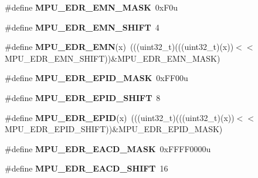 \begin{DoxyCompactItemize}
\item 
\#define {\bfseries M\+P\+U\+\_\+\+E\+D\+R\+\_\+\+E\+M\+N\+\_\+\+M\+A\+SK}~0x\+F0u\hypertarget{group__MPU__Register__Masks_ga57901086814557690f671d195d886423}{}\label{group__MPU__Register__Masks_ga57901086814557690f671d195d886423}

\item 
\#define {\bfseries M\+P\+U\+\_\+\+E\+D\+R\+\_\+\+E\+M\+N\+\_\+\+S\+H\+I\+FT}~4\hypertarget{group__MPU__Register__Masks_gad27c9ef1ae37201a6c16976311c5e1b3}{}\label{group__MPU__Register__Masks_gad27c9ef1ae37201a6c16976311c5e1b3}

\item 
\#define {\bfseries M\+P\+U\+\_\+\+E\+D\+R\+\_\+\+E\+MN}(x)~(((uint32\+\_\+t)(((uint32\+\_\+t)(x))$<$$<$M\+P\+U\+\_\+\+E\+D\+R\+\_\+\+E\+M\+N\+\_\+\+S\+H\+I\+FT))\&M\+P\+U\+\_\+\+E\+D\+R\+\_\+\+E\+M\+N\+\_\+\+M\+A\+SK)\hypertarget{group__MPU__Register__Masks_ga4d47da64a0139aeb64144967f3b60cfe}{}\label{group__MPU__Register__Masks_ga4d47da64a0139aeb64144967f3b60cfe}

\item 
\#define {\bfseries M\+P\+U\+\_\+\+E\+D\+R\+\_\+\+E\+P\+I\+D\+\_\+\+M\+A\+SK}~0x\+F\+F00u\hypertarget{group__MPU__Register__Masks_ga37328927ec3b6c036e4091cba2631af7}{}\label{group__MPU__Register__Masks_ga37328927ec3b6c036e4091cba2631af7}

\item 
\#define {\bfseries M\+P\+U\+\_\+\+E\+D\+R\+\_\+\+E\+P\+I\+D\+\_\+\+S\+H\+I\+FT}~8\hypertarget{group__MPU__Register__Masks_ga0cc03b3e200e7c9c27b3731305e7a007}{}\label{group__MPU__Register__Masks_ga0cc03b3e200e7c9c27b3731305e7a007}

\item 
\#define {\bfseries M\+P\+U\+\_\+\+E\+D\+R\+\_\+\+E\+P\+ID}(x)~(((uint32\+\_\+t)(((uint32\+\_\+t)(x))$<$$<$M\+P\+U\+\_\+\+E\+D\+R\+\_\+\+E\+P\+I\+D\+\_\+\+S\+H\+I\+FT))\&M\+P\+U\+\_\+\+E\+D\+R\+\_\+\+E\+P\+I\+D\+\_\+\+M\+A\+SK)\hypertarget{group__MPU__Register__Masks_gaba736292ab88b785970999d517661f14}{}\label{group__MPU__Register__Masks_gaba736292ab88b785970999d517661f14}

\item 
\#define {\bfseries M\+P\+U\+\_\+\+E\+D\+R\+\_\+\+E\+A\+C\+D\+\_\+\+M\+A\+SK}~0x\+F\+F\+F\+F0000u\hypertarget{group__MPU__Register__Masks_ga68e110ced075e97030f5c5a2f0cda968}{}\label{group__MPU__Register__Masks_ga68e110ced075e97030f5c5a2f0cda968}

\item 
\#define {\bfseries M\+P\+U\+\_\+\+E\+D\+R\+\_\+\+E\+A\+C\+D\+\_\+\+S\+H\+I\+FT}~16\hypertarget{group__MPU__Register__Masks_gac82a810678a3390409319ea636e93d84}{}\label{group__MPU__Register__Masks_gac82a810678a3390409319ea636e93d84}


\end{DoxyCompactItemize}
